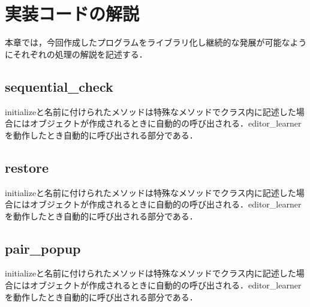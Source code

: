 \chapter{実装コードの解説}\label{codes}
本章では，今回作成したプログラムをライブラリ化し継続的な発展が可能なようにそれぞれの処理の解説を記述する．

\section{sequential\_check}\label{code_of_sequential_check}
initializeと名前に付けられたメソッドは特殊なメソッドでクラス内に記述した場合にはオブジェクトが作成されるときに自動的の呼び出される．editor\_learnerを動作したとき自動的に呼び出される部分である．

\section{restore}\label{code_of_restore}
initializeと名前に付けられたメソッドは特殊なメソッドでクラス内に記述した場合にはオブジェクトが作成されるときに自動的の呼び出される．editor\_learnerを動作したとき自動的に呼び出される部分である．

\section{pair\_popup}\label{code_of_pair_popup}
initializeと名前に付けられたメソッドは特殊なメソッドでクラス内に記述した場合にはオブジェクトが作成されるときに自動的の呼び出される．editor\_learnerを動作したとき自動的に呼び出される部分である．
